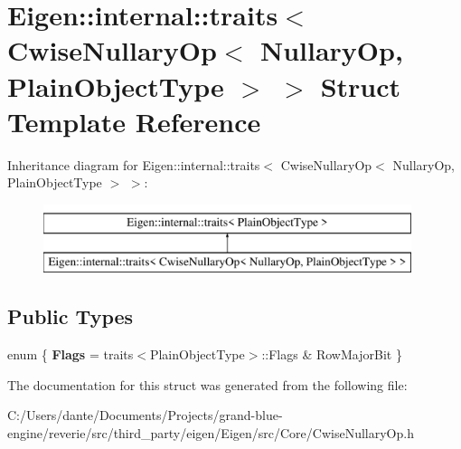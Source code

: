 \hypertarget{struct_eigen_1_1internal_1_1traits_3_01_cwise_nullary_op_3_01_nullary_op_00_01_plain_object_type_01_4_01_4}{}\section{Eigen\+::internal\+::traits$<$ Cwise\+Nullary\+Op$<$ Nullary\+Op, Plain\+Object\+Type $>$ $>$ Struct Template Reference}
\label{struct_eigen_1_1internal_1_1traits_3_01_cwise_nullary_op_3_01_nullary_op_00_01_plain_object_type_01_4_01_4}
Inheritance diagram for Eigen\+::internal\+::traits$<$ Cwise\+Nullary\+Op$<$ Nullary\+Op, Plain\+Object\+Type $>$ $>$\+:\begin{figure}[H]
\begin{center}
\leavevmode
\includegraphics[height=2.000000cm]{struct_eigen_1_1internal_1_1traits_3_01_cwise_nullary_op_3_01_nullary_op_00_01_plain_object_type_01_4_01_4}
\end{center}
\end{figure}
\subsection*{Public Types}
\begin{DoxyCompactItemize}
\item 
\mbox{\label{struct_eigen_1_1internal_1_1traits_3_01_cwise_nullary_op_3_01_nullary_op_00_01_plain_object_type_01_4_01_4_a4169b1a86f7e72719d689f6b82ff3919}} 
enum \{ {\bfseries Flags} = traits$<$Plain\+Object\+Type$>$\+::Flags \& Row\+Major\+Bit
 \}
\end{DoxyCompactItemize}


The documentation for this struct was generated from the following file\+:\begin{DoxyCompactItemize}
\item 
C\+:/\+Users/dante/\+Documents/\+Projects/grand-\/blue-\/engine/reverie/src/third\+\_\+party/eigen/\+Eigen/src/\+Core/Cwise\+Nullary\+Op.\+h\end{DoxyCompactItemize}
